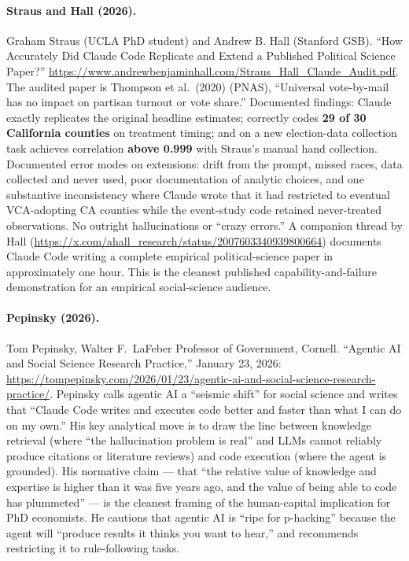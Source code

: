 \documentclass[11pt]{article}
\begin{document}
\paragraph{Straus and Hall (2026).} Graham Straus (UCLA PhD student) and Andrew B. Hall (Stanford GSB). ``How Accurately Did Claude Code Replicate and Extend a Published Political Science Paper?'' \url{https://www.andrewbenjaminhall.com/Straus_Hall_Claude_Audit.pdf}. The audited paper is Thompson et al.\ (2020) (PNAS), ``Universal vote-by-mail has no impact on partisan turnout or vote share.'' Documented findings: Claude exactly replicates the original headline estimates; correctly codes \textbf{29 of 30 California counties} on treatment timing; and on a new election-data collection task achieves correlation \textbf{above 0.999} with Straus's manual hand collection. Documented error modes on extensions: drift from the prompt, missed races, data collected and never used, poor documentation of analytic choices, and one substantive inconsistency where Claude wrote that it had restricted to eventual VCA-adopting CA counties while the event-study code retained never-treated observations. No outright hallucinations or ``crazy errors.'' A companion thread by Hall (\url{https://x.com/ahall_research/status/2007603340939800664}) documents Claude Code writing a complete empirical political-science paper in approximately one hour. This is the cleanest published capability-and-failure demonstration for an empirical social-science audience.

\paragraph{Pepinsky (2026).} Tom Pepinsky, Walter F.\ LaFeber Professor of Government, Cornell. ``Agentic AI and Social Science Research Practice,'' January 23, 2026: \url{https://tompepinsky.com/2026/01/23/agentic-ai-and-social-science-research-practice/}. Pepinsky calls agentic AI a ``seismic shift'' for social science and writes that ``Claude Code writes and executes code better and faster than what I can do on my own.'' His key analytical move is to draw the line between knowledge retrieval (where ``the hallucination problem is real'' and LLMs cannot reliably produce citations or literature reviews) and code execution (where the agent is grounded). His normative claim --- that ``the relative value of knowledge and expertise is higher than it was five years ago, and the value of being able to code has plummeted'' --- is the cleanest framing of the human-capital implication for PhD economists. He cautions that agentic AI is ``ripe for p-hacking'' because the agent will ``produce results it thinks you want to hear,'' and recommends restricting it to rule-following tasks.
\end{document}
